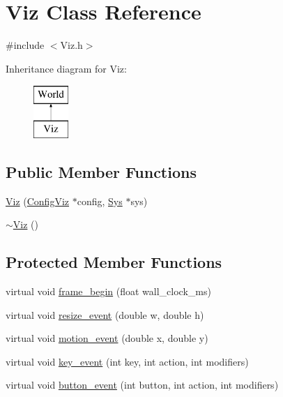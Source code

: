 \hypertarget{classViz}{}\section{Viz Class Reference}
\label{classViz}


{\ttfamily \#include $<$Viz.\+h$>$}

Inheritance diagram for Viz\+:\begin{figure}[H]
\begin{center}
\leavevmode
\includegraphics[height=2.000000cm]{classViz}
\end{center}
\end{figure}
\subsection*{Public Member Functions}
\begin{DoxyCompactItemize}
\item 
\mbox{\hyperlink{classViz_a6fa941420a23ec54d8474a082c1473dd}{Viz}} (\mbox{\hyperlink{classConfigViz}{Config\+Viz}} $\ast$config, \mbox{\hyperlink{classSys}{Sys}} $\ast$sys)
\item 
\mbox{\hyperlink{classViz_ac81b579cf0fc229d729887bc1ec09c73}{$\sim$\+Viz}} ()
\end{DoxyCompactItemize}
\subsection*{Protected Member Functions}
\begin{DoxyCompactItemize}
\item 
virtual void \mbox{\hyperlink{classViz_a29d2f5a0af409c50243da79ada86adad}{frame\+\_\+begin}} (float wall\+\_\+clock\+\_\+ms)
\item 
virtual void \mbox{\hyperlink{classViz_a222dae75063cafe9ea0f5d50c03e3d1b}{resize\+\_\+event}} (double w, double h)
\item 
virtual void \mbox{\hyperlink{classViz_a4ddb97f01a80d99a103b51685aaf67c8}{motion\+\_\+event}} (double x, double y)
\item 
virtual void \mbox{\hyperlink{classViz_ae77de461c1252a35cff01651295eddf5}{key\+\_\+event}} (int key, int action, int modifiers)
\item 
virtual void \mbox{\hyperlink{classViz_aaf5e987b9e03579f26bf86256ff7dcfd}{button\+\_\+event}} (int button, int action, int modifiers)
\end{DoxyCompactItemize}
